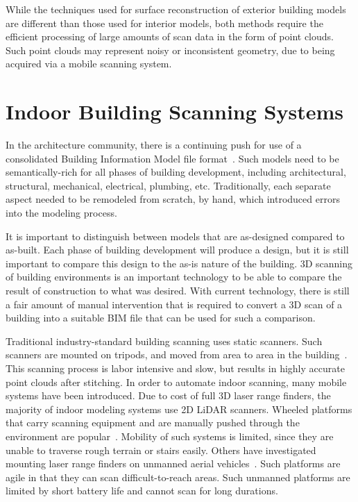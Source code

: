 \documentclass[12pt,onecolumn,oneside]{book}
\begin{document}
While the techniques used for surface reconstruction of exterior building models are different than those used for interior models, both methods require the efficient processing of large amounts of scan data in the form of point clouds.  Such point clouds may represent noisy or inconsistent geometry, due to being acquired via a mobile scanning system.

\section{Indoor Building Scanning Systems}
\label{sec:indoor_scanning}

In the architecture community, there is a continuing push for use of a consolidated Building Information Model file format~\cite{AutodeskBIM}.  Such models need to be semantically-rich for all phases of building development, including architectural, structural, mechanical, electrical, plumbing, etc.  Traditionally, each separate aspect needed to be remodeled from scratch, by hand, which introduced errors into the modeling process.

It is important to distinguish between models that are as-designed compared to as-built.  Each phase of building development will produce a design, but it is still important to compare this design to the as-is nature of the building.  3D scanning of building environments is an important technology to be able to compare the result of construction to what was desired.  With current technology, there is still a fair amount of manual intervention that is  required to convert a 3D scan of a building into a suitable BIM file that can be used for such a comparison.

Traditional industry-standard building scanning uses static scanners.  Such scanners are mounted on tripods, and moved from area to area in the building~\cite{RoomSegmentation,HistWallRecon,BasicPlaneFit}. This scanning process is labor intensive and slow, but results in highly accurate point clouds after stitching.  In order to automate indoor scanning, many mobile systems have been introduced. Due to cost of full 3D laser range finders, the majority of indoor modeling systems use 2D LiDAR scanners.  Wheeled platforms that carry scanning equipment and are manually pushed through the environment are popular~\cite{Carving, ProbabilisticRobotics}.  Mobility of such systems is limited, since they are unable to traverse rough terrain or stairs easily.  Others have investigated mounting laser range finders on unmanned aerial vehicles~\cite{Quadrotor,QuadrotorMIT,SpectralClustering}.  Such platforms are agile in that they can scan difficult-to-reach areas.  Such unmanned platforms are limited by short battery life and cannot scan for long durations.
\end{document}
